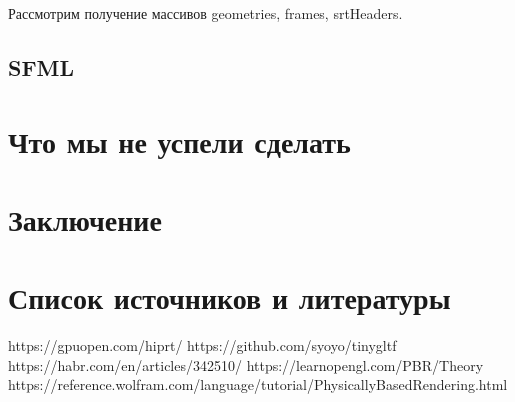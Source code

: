 \documentclass[a4paper,14pt]{extarticle}
\begin{document}
Рассмотрим получение массивов geometries, frames, srtHeaders. 

\subsection{SFML}

\section{Что мы не успели сделать}


\section{Заключение}
\section{Список источников и литературы}

https://gpuopen.com/hiprt/
https://github.com/syoyo/tinygltf
https://habr.com/en/articles/342510/
https://learnopengl.com/PBR/Theory
https://reference.wolfram.com/language/tutorial/PhysicallyBasedRendering.html
\end{document}
